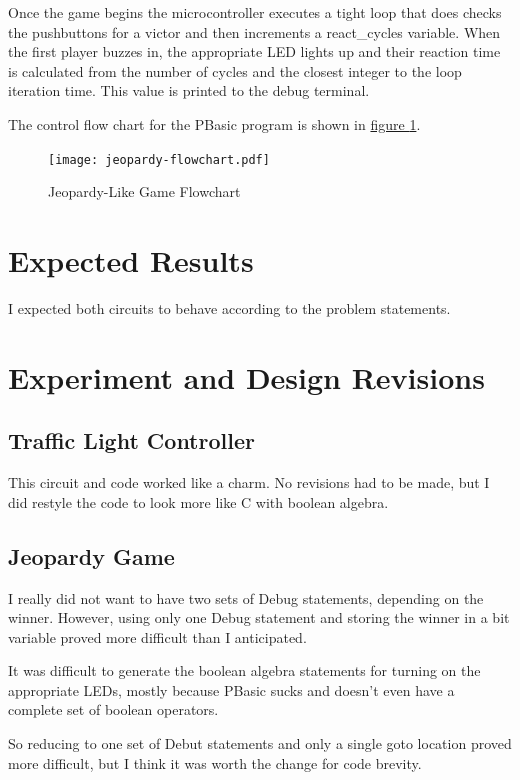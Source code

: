 \documentclass[11pt]{article}
\begin{document}
Once the game begins the microcontroller executes a tight loop that does checks the pushbuttons
for a victor and then increments a react\_cycles variable.
When the first player buzzes in, the appropriate LED lights up and their reaction
time is calculated from the number of cycles and the closest integer to the loop iteration time.
This value is printed to the debug terminal.

The control flow chart for the PBasic program is shown in \hyperref[jeopardy-flowchart]{figure \ref{jeopardy-flowchart}}.

\begin{figure}[ht]
\centering
\texttt{[image: jeopardy-flowchart.pdf]}
\caption{Jeopardy-Like Game Flowchart}
\label{jeopardy-flowchart}
\end{figure}

\section{Expected Results}

I expected both circuits to behave according to the problem statements.

\section{Experiment and Design Revisions}

\subsection{Traffic Light Controller}

This circuit and code worked like a charm.
No revisions had to be made, but I did restyle the code to look more like C with boolean algebra.

\subsection{Jeopardy Game}

I really did not want to have two sets of Debug statements, depending on the winner.
However, using only one Debug statement and storing the winner in a bit variable proved more difficult than I anticipated.

It was difficult to generate the boolean algebra statements for turning on the appropriate LEDs,
mostly because PBasic sucks and doesn't even have a complete set of boolean operators.

So reducing to one set of Debut statements and only a single goto location proved more difficult,
but I think it was worth the change for code brevity.
\end{document}
